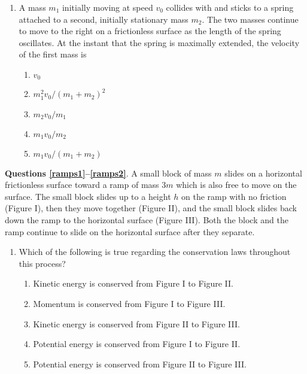 \documentclass{../../../oss-apphys}
\begin{document}
\begin{multicols}{2}
\begin{enumerate}[resume,leftmargin=18pt]
  \item A mass $m_1$ initially moving at speed $v_0$ collides with and sticks
    to a spring attached to a second, initially stationary mass $m_2$. The two
    masses continue to move to the right on a frictionless surface as the
    length of the spring oscillates. At the instant that the spring is
    maximally extended, the velocity of the first mass is
    \begin{center}
    \end{center}
    \begin{enumerate}[noitemsep,topsep=0pt,leftmargin=18pt,label=(\Alph*)]
    \item $v_0$
    \item $m_1^2v_0/(m_1+m_2)^2$
    \item $m_2v_0/m_1$
    \item $m_1v_0/m_2$
    \item $m_1v_0/(m_1+m_2)$
    \end{enumerate}
  \end{enumerate}
  \columnbreak
  
  \textbf{Questions \ref{ramps1}--\ref{ramps2}}. A small block of mass $m$
  slides on a horizontal frictionless surface toward a ramp of mass $3m$ which
  is also free to move on the surface. The small block slides up to a height
  $h$ on the ramp with no friction (Figure I), then they move together (Figure
  II), and the small block slides back down the ramp to the horizontal surface
  (Figure III). Both the block and the ramp continue to slide on the horizontal
  surface after they separate.
  \begin{center}
  \end{center}
  \begin{enumerate}[resume,leftmargin=18pt]  
  \item Which of the following is true regarding the conservation laws
    throughout this process?
    \label{ramps1}
    \begin{enumerate}[noitemsep,topsep=0pt,leftmargin=18pt,label=(\Alph*)]
    \item Kinetic energy is conserved from Figure I to Figure II.
    \item Momentum is conserved from Figure I to Figure III.
    \item Kinetic energy is conserved from Figure II to Figure III.
    \item Potential energy is conserved from Figure I to Figure II.
    \item Potential energy is conserved from Figure II to Figure III.
    \end{enumerate}
    

\end{enumerate}
\end{multicols}
\end{document}
